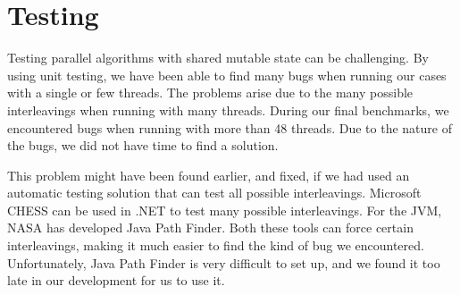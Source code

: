 \section{Testing}
\label{sec:testing}
Testing parallel algorithms with shared mutable state can be challenging. By
using unit testing, we have been able to find many bugs when running our
cases with a single or few threads. The problems arise due to the many possible
interleavings when running with many threads. During our final benchmarks, we
encountered bugs when running with more than 48 threads. Due to the nature of
the bugs, we did not have time to find a solution.

This problem might have been found earlier, and fixed, if we had used an automatic testing solution that can test all possible interleavings. Microsoft CHESS can be used in .NET to test many possible interleavings. 
For the JVM, NASA has developed Java Path Finder. 
Both these tools can force certain interleavings, making it much easier to find the kind of bug we encountered. 
Unfortunately, Java Path Finder is very difficult to set up, and we found it too late in our development for us to use it.
